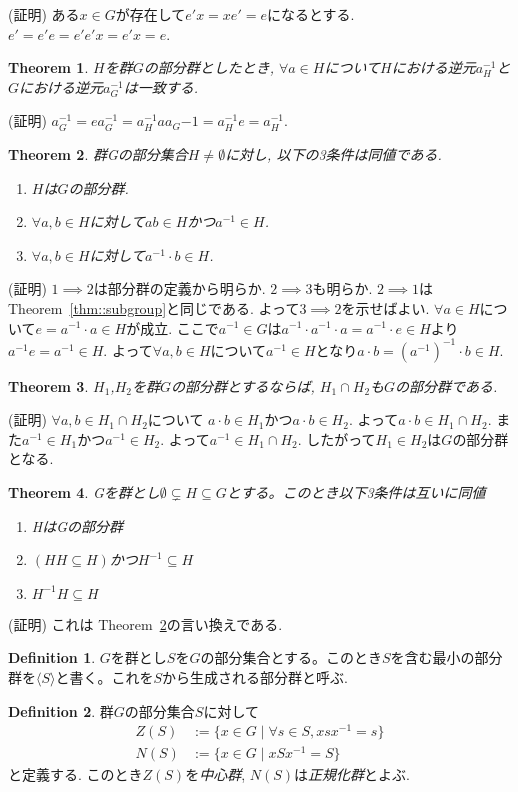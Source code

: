 \documentclass{article}
\theoremstyle{plain}
\newtheorem{theorem}{Theorem}
\theoremstyle{definition}
\newtheorem{definition}{Definition}
\theoremstyle{plain}
\numberwithin{equation}{section}
\numberwithin{theorem}{section}
\numberwithin{definition}{section}
\numberwithin{note}{section}
\begin{document}
(証明) ある$x\in G$が存在して$e'x=xe'=e$になるとする. $e'=e'e=e'e'x=e'x=e$.
\begin{theorem}
     $H$を群$G$の部分群としたとき, $\forall a\in H$について$H$における逆元$a_H^{-1}$と$G$における逆元$a_G^{-1}$は一致する.
\end{theorem}
(証明) $a_G^{-1}=ea_G^{-1}=a_H^{-1}aa_G{-1}=a_H^{-1}e=a_H^{-1}$.
\begin{theorem}\label{them::subgroup3}
     群Gの部分集合$H\neq \emptyset$に対し, 以下の3条件は同値である.
     \begin{enumerate}
          \item $H$は$G$の部分群.
          \item $\forall a,b \in H$に対して$ab\in H$かつ$ a^{-1}\in H$.
          \item $\forall a,b \in H$に対して$a^{-1}\cdot b\in H$.
     \end{enumerate}
\end{theorem}
(証明) $1\implies 2$は部分群の定義から明らか. $2\implies 3$も明らか.
$2\implies 1$は Theorem~\ref{thm::subgroup}と同じである.
よって$3\implies 2$を示せばよい.
$\forall a\in H$について$e=a^{-1}\cdot a\in H$が成立. ここで$a^{-1}\in G$は$a^{-1}\cdot a^{-1}\cdot a=a^{-1}\cdot e \in H$より$a^{-1}e=a^{-1}\in H$.
よって$\forall a,b \in H$について$a^{-1}\in H$となり$a\cdot b=(a^{-1})^{-1}\cdot b\in H$.
\begin{theorem}
     $H_1$,$H_2$を群$G$の部分群とするならば, $H_1\cap H_2$も$G$の部分群である.
\end{theorem}
(証明) $\forall a,b\in H_1\cap H_2$について $a\cdot b\in H_1$かつ$a\cdot b\in H_2$. よって$a\cdot b\in H_1\cap H_2$.
また$a^{-1}\in H_1$かつ$a^{-1}\in H_2$. よって$a^{-1}\in H_1\cap H_2$. したがって$H_1\in H_2$は$G$の部分群となる.
\begin{theorem}
     Gを群とし$\emptyset \subsetneq H\subseteq G$とする。このとき以下3条件は互いに同値
     \begin{enumerate}
          \item HはGの部分群
          \item $(HH\subseteq H)$かつ$H^{-1}\subseteq H$
          \item $H^{-1}H\subseteq H$
     \end{enumerate}
\end{theorem}
(証明) これは Theorem~\ref{them::subgroup3}の言い換えである.
\begin{definition}
     $G$を群とし$S$を$G$の部分集合とする。このとき$S$を含む最小の部分群を$\langle S \rangle$と書く。これを$S$から生成される部分群と呼ぶ.
\end{definition}
\begin{definition}
     群$G$の部分集合$S$に対して
     \begin{align}
          Z(S)&:=\lbrace x\in G\mid \forall s\in S, xsx^{-1}=s\rbrace\\
          N(S)&:=\lbrace x\in G \mid  xSx^{-1}=S\rbrace
     \end{align}
     と定義する. このとき$Z(S)$を\emph{中心群}, $N(S)$は\emph{正規化群}とよぶ.
\end{definition}
\end{document}
